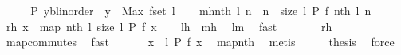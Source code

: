\begin{isabellebody}
%
\isadelimproof
%
\endisadelimproof
%
\isatagproof
{}\isamarkupfalse%
\ {\isacharminus}\isanewline
\ \ \isamarkupfalse%
\ {\isacharquery}P{\isacharequal}{\isachardoublequoteopen}{\isacharpercent}\ y{\isacharcolon}{\isacharcolon}{\isacharparenleft}{\isacharprime}b{\isacharcolon}{\isacharcolon}linorder{\isacharparenright}\ {\isachardot}\ y\ {\isasymge}\ Max\ {\isacharparenleft}f{\isacharbackquote}{\isacharparenleft}set\ l{\isacharparenright}{\isacharparenright}{\isachardoublequoteclose}\isanewline
\ \ \isamarkupfalse%
\ {\isacharquery}mh{\isacharequal}{\isachardoublequoteopen}{\isacharbrackleft}nth\ l\ n\ {\isachardot}\ n\ {\isacharless}{\isacharminus}\ {\isacharbrackleft}{}{\isachardot}{\isachardot}{\isacharless}size\ l{\isacharbrackright}{\isacharcomma}\ {\isacharquery}P\ {\isacharparenleft}f\ {\isacharparenleft}nth\ l\ n{\isacharparenright}{\isacharparenright}{\isacharbrackright}{\isachardoublequoteclose}\isanewline
\ \ \isamarkupfalse%
\ {\isacharquery}rh{\isacharequal}{\isachardoublequoteopen}{\isacharbrackleft}\ x\ {\isacharless}{\isacharminus}\ {\isacharparenleft}map\ {\isacharparenleft}nth\ l{\isacharparenright}\ {\isacharbrackleft}{}{\isachardot}{\isachardot}{\isacharless}size\ l{\isacharbrackright}{\isacharparenright}{\isachardot}\ {\isacharquery}P\ {\isacharparenleft}f\ x{\isacharparenright}{\isacharbrackright}{\isachardoublequoteclose}\isanewline
\ \ \isamarkupfalse%
\ {\isachardoublequoteopen}{\isacharquery}lh\ {\isacharequal}\ {\isacharquery}mh{\isachardoublequoteclose}\ \isamarkupfalse%
\ lm{}{}\ \isamarkupfalse%
\ fast\isanewline
\ \ \isamarkupfalse%
\ \isamarkupfalse%
\ {\isachardoublequoteopen}{\isachardot}{\isachardot}{\isachardot}\ {\isacharequal}\ {\isacharquery}rh{\isachardoublequoteclose}\ \isamarkupfalse%
\ map{\isacharunderscore}commutes\ \isamarkupfalse%
\ fast\isanewline
\ \ \isamarkupfalse%
\ \isamarkupfalse%
\ {\isachardoublequoteopen}{\isachardot}{\isachardot}{\isachardot}{\isacharequal}\ {\isacharbrackleft}x\ {\isacharless}{\isacharminus}\ l{\isachardot}\ {\isacharquery}P\ {\isacharparenleft}f\ x{\isacharparenright}{\isacharbrackright}{\isachardoublequoteclose}\ \isamarkupfalse%
\ map{\isacharunderscore}nth\ \isamarkupfalse%
\ metis\isanewline
\ \ \isamarkupfalse%
\ \isamarkupfalse%
\ {\isacharquery}thesis\ \isamarkupfalse%
\ force\isanewline
{}\isamarkupfalse%
%
\endisatagproof
{\isafoldproof}%
%
\isadelimproof
%
\endisadelimproof
\isanewline
%
\isadelimtheory
\isanewline
%
\endisadelimtheory
%
\isatagtheory
{}\isamarkupfalse%
%
\endisatagtheory
{\isafoldtheory}%
%
\isadelimtheory
%
\endisadelimtheory
\end{isabellebody}%

